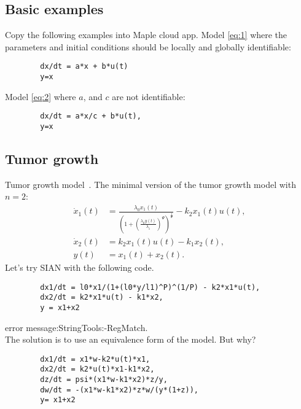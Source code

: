 \documentclass[10pt]{beamer}
\begin{document}
\subsection{Basic examples}

\begin{frame}[fragile]{Copy the following examples into Maple cloud app.}
	Model \eqref{eq:1} where the parameters and initial conditions should be locally and globally identifiable:
	\begin{lstlisting}
		dx/dt = a*x + b*u(t)
		y=x
	\end{lstlisting}
\vspace{20pt}
	Model \eqref{eq:2} where $a$, and $c$ are not identifiable:
	\begin{lstlisting}
		dx/dt = a*x/c + b*u(t),
		y=x
	\end{lstlisting}
\end{frame}

\subsection{Tumor growth}

\begin{frame}[fragile]{Tumor growth model~.}
	The minimal version of the tumor growth model with $n=2$:
	\begin{subequations}
		\begin{align}
			\dot x_1(t) &= \frac{\lambda_0 x_1(t)}{(1+(\frac{\lambda_0 y(t)}{\lambda_1})^\Psi)^\frac{1}{\Psi}} - k_2 x_1(t) u(t), \\
			\dot x_2(t) &= k_2 x_1(t) u(t) - k_1 x_2(t), \\
			y(t) &= x_1(t) + x_2(t).
		\end{align}
	\end{subequations}
	Let's try SIAN with the following code.
	\begin{lstlisting}
		dx1/dt = l0*x1/(1+(l0*y/l1)^P)^(1/P) - k2*x1*u(t),
		dx2/dt = k2*x1*u(t) - k1*x2,
		y = x1+x2
	\end{lstlisting}
	\color{red} error message:StringTools:-RegMatch. \\ 
	\color{black} The solution is to use an equivalence form of the model. But why?
	\begin{lstlisting}
		dx1/dt = x1*w-k2*u(t)*x1, 
		dx2/dt = k2*u(t)*x1-k1*x2,
		dz/dt = psi*(x1*w-k1*x2)*z/y,
		dw/dt = -(x1*w-k1*x2)*z*w/(y*(1+z)),
		y= x1+x2
	\end{lstlisting}
\end{frame}
\end{document}
